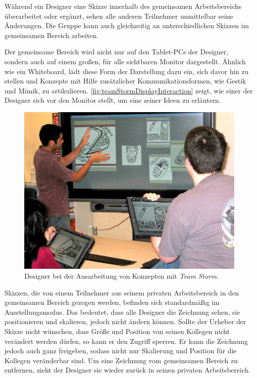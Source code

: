 Während ein Designer eine Skizze innerhalb des gemeinsamen Arbeitsbereichs überarbeitet oder ergänzt, sehen alle anderen Teilnehmer unmittelbar seine Änderungen. Die Gruppe kann auch gleichzeitig an unterschiedlichen Skizzen im gemeinsamen Bereich arbeiten.

Der gemeinsame Bereich wird nicht nur auf den Tablet-PCs der Designer, sondern auch auf einem großen, für alle sichtbaren Monitor dargestellt. Ähnlich wie ein Whiteboard, lädt diese Form der Darstellung dazu ein, sich davor hin zu stellen und Konzepte mit Hilfe zusätzlicher Kommunikationsformen, wie Gestik und Mimik, zu artikulieren. \autoref{fig:teamStormDisplayInteraction} zeigt, wie einer der Designer sich vor den Monitor stellt, um eine seiner Ideen zu erläutern.\\

\begin{figure}[bth]
	\includegraphics[width=\linewidth]{gfx/teamStormDisplayInteraction.png}
	\caption[Ausarbeitung von Konzepten \newline \citep{Hailpern:2007p113}]{Designer bei der Ausarbeitung von Konzepten mit \emph{Team Storm}.}
	\label{fig:teamStormDisplayInteraction}
\end{figure}

Skizzen, die von einem Teilnehmer aus seinem privaten Arbeitsbereich in den gemeinsamen Bereich gezogen werden, befinden sich standardmäßig im Ausstellungsmodus. Das bedeutet, dass alle Designer die Zeichnung sehen, sie positionieren und skalieren, jedoch nicht ändern können. Sollte der Urheber der Skizze nicht wünschen, dass Größe und Position von seinen Kollegen nicht verändert werden dürfen, so kann er den Zugriff sperren. Er kann die Zeichnung jedoch auch ganz freigeben, sodass nicht nur Skalierung und Position für die Kollegen veränderbar sind. Um eine Zeichnung vom gemeinsamen Bereich zu entfernen, zieht der Designer sie wieder zurück in seinen privaten Arbeitsbereich.


